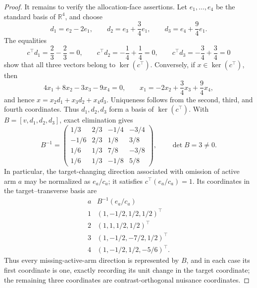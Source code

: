 \documentclass{article}
\begin{document}
\begin{proof}
It remains to verify the allocation-face assertions.  Let \(e_1,\ldots,e_4\) be the standard basis of \(\mathbb R^4\), and choose
\[
 d_1=e_2-2e_1,\qquad
 d_2=e_3+\frac34e_1,\qquad
 d_3=e_4+\frac94e_1.
\]
The equalities
\[
 c^\top d_1=\frac23-\frac23=0,
 \qquad
 c^\top d_2=-\frac14+\frac14=0,
 \qquad
 c^\top d_3=-\frac34+\frac34=0
\]
show that all three vectors belong to \(\ker(c^\top)\).  Conversely, if \(x\in\ker(c^\top)\), then
\[
 4x_1+8x_2-3x_3-9x_4=0,
 \qquad
 x_1=-2x_2+\frac34x_3+\frac94x_4,
\]
and hence \(x=x_2d_1+x_3d_2+x_4d_3\).  Uniqueness follows from the second, third, and fourth coordinates.  Thus \(d_1,d_2,d_3\) form a basis of \(\ker(c^\top)\).  With \(B=[v,d_1,d_2,d_3]\), exact elimination gives
\[
 B^{-1}=
 \begin{pmatrix}
 1/3&2/3&-1/4&-3/4\\
 -1/6&2/3&1/8&3/8\\
 1/6&1/3&7/8&-3/8\\
 1/6&1/3&-1/8&5/8
 \end{pmatrix},
 \qquad \det B=3\ne0.
\]
In particular, the target-changing direction associated with omission of active arm \(a\) may be normalized as \(e_a/c_a\); it satisfies \(c^\top(e_a/c_a)=1\).  Its coordinates in the target--transverse basis are
\[
\begin{array}{c|c}
a&B^{-1}(e_a/c_a)\\ \hline
1&(1,-1/2,1/2,1/2)^\top\\
2&(1,1,1/2,1/2)^\top\\
3&(1,-1/2,-7/2,1/2)^\top\\
4&(1,-1/2,1/2,-5/6)^\top.
\end{array}
\]
Thus every missing-active-arm direction is represented by \(B\), and in each case its first coordinate is one, exactly recording its unit change in the target coordinate; the remaining three coordinates are contrast-orthogonal nuisance coordinates.


\end{proof}
\end{document}
